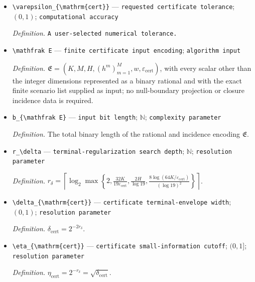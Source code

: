 \documentclass{article}
\begin{document}
\begin{itemize}
  \item \texttt{\textbackslash{}\allowbreak{}varepsilon\_\allowbreak{}\{\textbackslash{}\allowbreak{}mathrm\{cert\}\allowbreak{}\}\allowbreak{}} --- \texttt{requested certificate tolerance}; \((0,1)\); \texttt{computational accuracy}
  \par\smallskip\noindent\emph{Definition.} \texttt{A user-\allowbreak{}selected numerical tolerance.}
  \item \texttt{\textbackslash{}\allowbreak{}mathfrak E} --- \texttt{finite certificate input encoding}; \texttt{algorithm input}
  \par\smallskip\noindent\emph{Definition.} \(\mathfrak E=(K,M,H,(h^m)_{m=1}^M,w,\varepsilon_{\mathrm{cert}})\), with every scalar other than the integer dimensions represented as a binary rational and with the exact finite scenario list supplied as input; no null-boundary projection or closure incidence data is required.
  \item \texttt{b\_\allowbreak{}\{\textbackslash{}\allowbreak{}mathfrak E\}\allowbreak{}} --- \texttt{input bit length}; \(\mathbb N\); \texttt{complexity parameter}
  \par\smallskip\noindent\emph{Definition.} The total binary length of the rational and incidence encoding \(\mathfrak E\).
  \item \texttt{r\_\allowbreak{}\textbackslash{}\allowbreak{}delta} --- \texttt{terminal-\allowbreak{}regularization search depth}; \(\mathbb N\); \texttt{resolution parameter}
  \par\smallskip\noindent\emph{Definition.} \(r_\delta=\left\lceil\log_2\max\left\{2,\frac{32K}{19\varepsilon_{\mathrm{cert}}},\frac{2H}{\log 19},\frac{8\log(64K/\varepsilon_{\mathrm{cert}})}{(\log 19)^2}\right\}\right\rceil\).
  \item \texttt{\textbackslash{}\allowbreak{}delta\_\allowbreak{}\{\textbackslash{}\allowbreak{}mathrm\{cert\}\allowbreak{}\}\allowbreak{}} --- \texttt{certificate terminal-\allowbreak{}envelope width}; \((0,1)\); \texttt{resolution parameter}
  \par\smallskip\noindent\emph{Definition.} \(\delta_{\mathrm{cert}}=2^{-2r_\delta}\).
  \item \texttt{\textbackslash{}\allowbreak{}eta\_\allowbreak{}\{\textbackslash{}\allowbreak{}mathrm\{cert\}\allowbreak{}\}\allowbreak{}} --- \texttt{certificate small-\allowbreak{}information cutoff}; \((0,1]\); \texttt{resolution parameter}
  \par\smallskip\noindent\emph{Definition.} \(\eta_{\mathrm{cert}}=2^{-r_\delta}=\sqrt{\delta_{\mathrm{cert}}}\).

\end{itemize}
\end{document}
